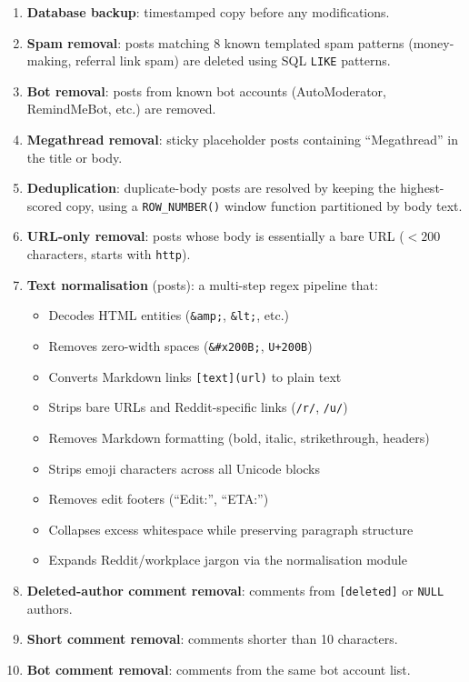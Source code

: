 \documentclass[11pt,a4paper]{article}
\begin{document}
\begin{enumerate}[leftmargin=*]
  \item \textbf{Database backup}: timestamped copy before any modifications.
  \item \textbf{Spam removal}: posts matching 8 known templated spam patterns (money-making, referral link spam) are deleted using SQL \texttt{LIKE} patterns.
  \item \textbf{Bot removal}: posts from known bot accounts (AutoModerator, RemindMeBot, etc.) are removed.
  \item \textbf{Megathread removal}: sticky placeholder posts containing ``Megathread'' in the title or body.
  \item \textbf{Deduplication}: duplicate-body posts are resolved by keeping the highest-scored copy, using a \texttt{ROW\_NUMBER()} window function partitioned by body text.
  \item \textbf{URL-only removal}: posts whose body is essentially a bare URL ($< 200$ characters, starts with \texttt{http}).
  \item \textbf{Text normalisation} (posts): a multi-step regex pipeline that:
  \begin{itemize}
    \item Decodes HTML entities (\texttt{\&amp;}, \texttt{\&lt;}, etc.)
    \item Removes zero-width spaces (\texttt{\&\#x200B;}, \texttt{U+200B})
    \item Converts Markdown links \texttt{[text](url)} to plain text
    \item Strips bare URLs and Reddit-specific links (\texttt{/r/}, \texttt{/u/})
    \item Removes Markdown formatting (bold, italic, strikethrough, headers)
    \item Strips emoji characters across all Unicode blocks
    \item Removes edit footers (``Edit:'', ``ETA:'')
    \item Collapses excess whitespace while preserving paragraph structure
    \item Expands Reddit/workplace jargon via the normalisation module
  \end{itemize}
  \item \textbf{Deleted-author comment removal}: comments from \texttt{[deleted]} or \texttt{NULL} authors.
  \item \textbf{Short comment removal}: comments shorter than 10 characters.
  \item \textbf{Bot comment removal}: comments from the same bot account list.

\end{enumerate}
\end{document}
